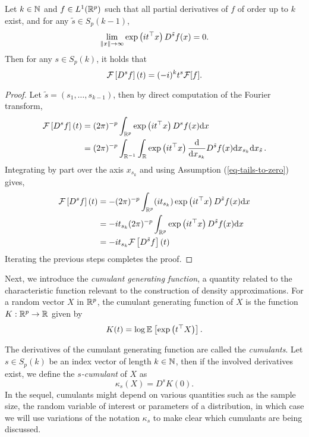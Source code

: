 \begin{lemma} \label{lemma-fourier-derivative}
    Let $k \in \N$ and $f \in L^1(\Rp)$ such that all partial derivatives of $f$ of order up to $k$ exist, and for any $\tilde{s} \in S_p(k-1)$,
    \begin{equation} \label{eq-tails-to-zero}
        \lim_{\norm{x} \rightarrow \infty} \expf{it^\top x}D^{\tilde{s}}f(x) = 0.
    \end{equation}
    Then for any $s \in S_p(k)$, it holds that
    \begin{equation*}
        \F\left[D^s f \right](t) = (-i)^k t^s \F[f].
    \end{equation*}
\end{lemma}
\begin{proof}
    Let $\tilde{s} = (s_1, \ldots, s_{k-1})$, then by direct computation of the Fourier transform,
    \begin{align*}
        \F\left[D^s f \right](t) 
        &= (2\pi)^{-p}\intRp{x}{ \expf{it^\top x} D^s f(x) } \\
        &= (2\pi)^{-p}\int_{\R^{-1}} \int_\R 
            \expf{it^\top x} \ddx{x_{s_k}} D^{\tilde{s}} f(x) 
        \d x_{s_k} \d x_{\tilde{s}}\,.
    \end{align*}
    Integrating by part over the axis $x_{s_k}$ and using Assumption (\ref{eq-tails-to-zero}) gives,
    \begin{align*}
        \F\left[D^s f \right](t)  
        &= - (2\pi)^{-p}\intRp{x}{
            (it_{s_k})\expf{it^\top x} D^{\tilde{s}} f(x)
        } \\
        &= -it_{s_k} (2\pi)^{-p}\intRp{x}{
            \expf{it^\top x} D^{\tilde{s}} f(x)
        } \\
        &= -it_{s_k} \F\left[D^{\tilde{s}} f \right](t)
    \end{align*}
    Iterating the previous steps completes the proof.
\end{proof}

Next, we introduce the \textit{cumulant generating function}, a quantity related to the characteristic function relevant to the construction of density approximations. For a random vector $X$ in $\Rp$, the cumulant generating function of $X$ is the function $K : \Rp \rightarrow \R$ given by
\begin{equation*}
    K(t) = \log \expec{}{\expf{t^\top X}}.
\end{equation*}

The derivatives of the cumulant generating function are called the \textit{cumulants}. Let $s \in S_p(k)$ be an index vector of length $k \in \N$, then if the involved derivatives exist, we define the \textit{$s$-cumulant} of $X$ as
\begin{equation*}
    \kappa_s(X) = D^s K(0).
\end{equation*}
In the sequel, cumulants might depend on various quantities such as the sample size, the random variable of interest or parameters of a distribution, in which case we will use variations of the notation $\kappa_s$ to make clear which cumulants are being discussed.


